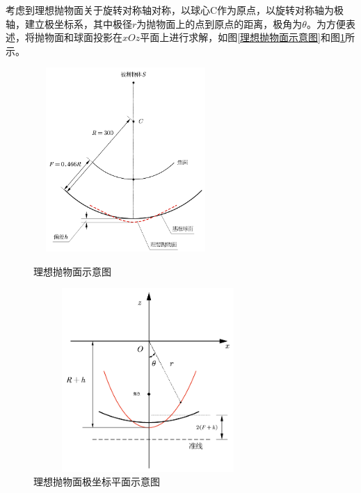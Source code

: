 \documentclass[withoutpreface,bwprint]{cumcmthesis} %
\begin{document}
		考虑到理想抛物面关于旋转对称轴对称，以球心C作为原点，以旋转对称轴为极轴，建立极坐标系，其中极径$r$为抛物面上的点到原点的距离，极角为$\theta$。为方便表述，将抛物面和球面投影在$xOz$平面上进行求解，如图\ref{理想抛物面示意图}和图\ref{理想抛物面极坐标平面示意图}所示。
			\begin{figure}[!htp]
			\centering
			\begin{minipage}[t]{0.35\linewidth}
				\centering
				\includegraphics[height=7cm,width=7cm]{理想抛物面示意图}
				\caption{理想抛物面示意图}
				\label{理想抛物面示意图}
			\end{minipage}%
			\hfill
			\begin{minipage}[t]{0.5\linewidth}
				\centering
				\includegraphics[height=7cm,width=8.7cm]{理想抛物面极坐标平面示意图}
				\caption{理想抛物面极坐标平面示意图}
				\label{理想抛物面极坐标平面示意图}
			\end{minipage}
		\end{figure}
\end{document}
